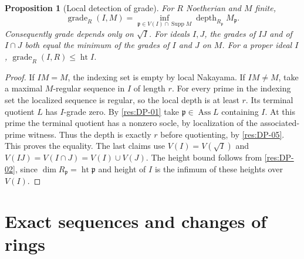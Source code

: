 \documentclass[11pt,oneside,openany]{book}
\newtheorem{proposition}[theorem]{Proposition}
\theoremstyle{definition}
\theoremstyle{remark}
\begin{document}
\begin{proposition}[Local detection of grade]\label{res:DP-06}
For $R$ Noetherian and $M$ finite,
\[
 \operatorname{grade}_R(I,M)=
 \inf_{\mathfrak p\in V(I)\cap\operatorname{Supp}M}
 \operatorname{depth}_{R_{\mathfrak p}}M_{\mathfrak p}.
\]
Consequently grade depends only on $\sqrt I$. For ideals $I,J$,
the grades of $IJ$ and of $I\cap J$ both equal the minimum of the
grades of $I$ and $J$ on $M$. For a proper ideal $I$,
$\operatorname{grade}_R(I,R)\le\operatorname{ht}I$.
\end{proposition}
\begin{proof}
If $IM=M$, the indexing set is empty by local Nakayama.
If $IM\ne M$, take a maximal $M$-regular sequence in $I$ of length
$r$. For every prime in the indexing set the localized sequence is
regular, so the local depth is at least $r$. Its terminal quotient
$L$ has $I$-grade zero. By \ref{res:DP-01} take
$\mathfrak p\in\operatorname{Ass}L$ containing $I$. At this prime the
terminal quotient has a nonzero socle, by localization of the
associated-prime witness. Thus the depth is exactly $r$ before
quotienting, by \ref{res:DP-05}. This proves the equality. The last
claims use $V(I)=V(\sqrt I)$ and $V(IJ)=V(I\cap J)=V(I)\cup V(J)$.
The height bound follows from \ref{res:DP-02}, since
$\dim R_{\mathfrak p}=\operatorname{ht}\mathfrak p$ and height of
$I$ is the infimum of these heights over $V(I)$.
\end{proof}

\section{Exact sequences and changes of rings}
\end{document}
